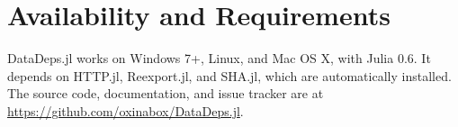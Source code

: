 \documentclass[twoside,11pt]{article}
\begin{document}
\section{Availability and Requirements}
DataDeps.jl works on  Windows 7+, Linux, and Mac OS X, with Julia 0.6.
It depends on HTTP.jl, Reexport.jl, and SHA.jl, which are automatically installed.
The source code, documentation, and issue tracker are at \url{https://github.com/oxinabox/DataDeps.jl}.

\newpage

\end{document}
